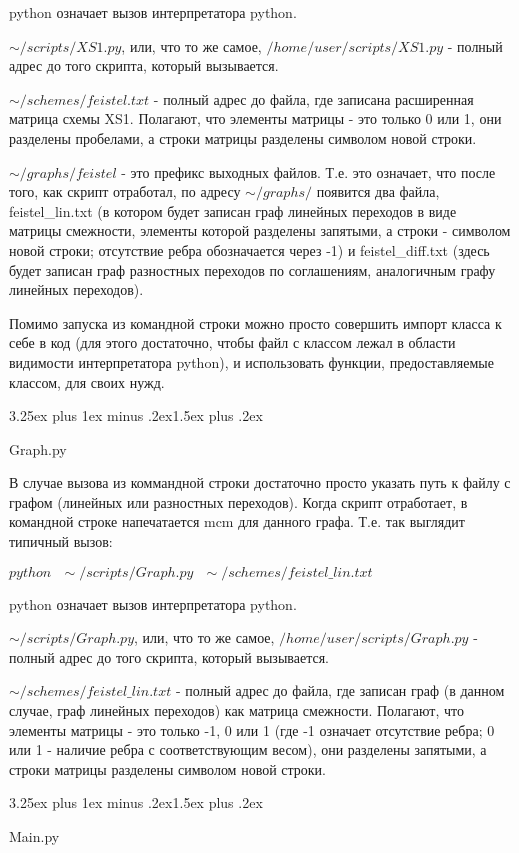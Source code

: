 \documentclass[a4paper,12pt]{report}
\makeatletter
\theoremstyle{plain} %
\theoremstyle{definition}
\theoremstyle{remark}
\renewcommand{\subsection}{\@startsection{subsection}{2}{18pt}%
{3.25ex plus 1ex minus .2ex}{1.5ex plus .2ex}%
{\normalfont\large\bfseries\raggedright}}%
\makeatother
\begin{document}
\begin{large}
python означает вызов интерпретатора python.

$\sim/scripts/XS1.py$, или, что то же самое, $/home/user/scripts/XS1.py$ - полный адрес до того скрипта, который вызывается.

$\sim/schemes/feistel.txt$ - полный адрес до файла, где записана расширенная матрица схемы XS1. Полагают, что элементы матрицы - это только 0 или 1, они разделены пробелами, а строки матрицы разделены символом новой строки.

$\sim/graphs/feistel$ - это префикс выходных файлов. Т.е. это означает, что после того, как скрипт отработал, по адресу $\sim/graphs/$ появится два файла, feistel\_lin.txt (в котором будет записан граф линейных переходов в виде матрицы смежности, элементы которой разделены запятыми, а строки - символом новой строки; отсутствие ребра обозначается через -1) и feistel\_diff.txt (здесь будет записан  граф разностных переходов по соглашениям, аналогичным графу линейных переходов).

Помимо запуска из командной строки можно просто совершить импорт класса к себе в код (для этого достаточно, чтобы файл с классом лежал в области видимости интерпретатора python), и использовать функции, предоставляемые классом, для своих нужд.

\subsection{Graph.py}

В случае вызова из коммандной строки достаточно просто указать путь к файлу с графом (линейных или разностных переходов). Когда скрипт отработает, в командной строке напечатается mcm для данного графа. Т.е. так выглядит типичный вызов:

$python ~~~\sim/scripts/Graph.py~~~ \sim/schemes/feistel\_lin.txt$

python означает вызов интерпретатора python.

$\sim/scripts/Graph.py$, или, что то же самое, $/home/user/scripts/Graph.py$ - полный адрес до того скрипта, который вызывается.

$\sim/schemes/feistel\_lin.txt$ - полный адрес до файла, где записан граф (в данном случае, граф линейных переходов) как матрица смежности. Полагают, что элементы матрицы - это только -1, 0 или 1 (где -1 означает отсутствие ребра; 0 или 1 - наличие ребра с соответствующим весом), они разделены запятыми, а строки матрицы разделены символом новой строки.

\subsection{Main.py}


\end{large}
\end{document}
